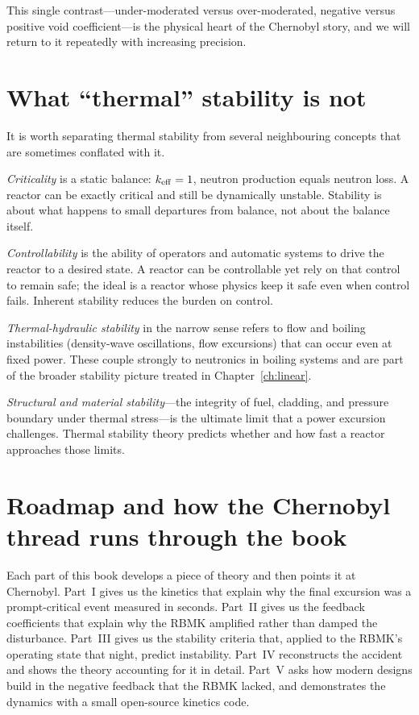 This single contrast---under-moderated versus over-moderated, negative versus
positive void coefficient---is the physical heart of the Chernobyl story, and we
will return to it repeatedly with increasing precision.

\section{What ``thermal'' stability is not}

It is worth separating thermal stability from several neighbouring concepts that
are sometimes conflated with it.

\emph{Criticality} is a static balance: $k_{\mathrm{eff}}=1$, neutron production equals
neutron loss. A reactor can be exactly critical and still be dynamically
unstable. Stability is about what happens to small departures from balance, not
about the balance itself.

\emph{Controllability} is the ability of operators and automatic systems to
drive the reactor to a desired state. A reactor can be controllable yet rely on
that control to remain safe; the ideal is a reactor whose physics keep it safe
even when control fails. Inherent stability reduces the burden on control.

\emph{Thermal-hydraulic stability} in the narrow sense refers to flow and
boiling instabilities (density-wave oscillations, flow excursions) that can
occur even at fixed power. These couple strongly to neutronics in boiling
systems and are part of the broader stability picture treated in
Chapter~\ref{ch:linear}.

\emph{Structural and material stability}---the integrity of fuel, cladding, and
pressure boundary under thermal stress---is the ultimate limit that a power
excursion challenges. Thermal stability theory predicts whether and how fast a
reactor approaches those limits.

\section{Roadmap and how the Chernobyl thread runs through the book}

Each part of this book develops a piece of theory and then points it at
Chernobyl. Part~I gives us the kinetics that explain why the final excursion was
a prompt-critical event measured in seconds. Part~II gives us the feedback
coefficients that explain why the RBMK amplified rather than damped the
disturbance. Part~III gives us the stability criteria that, applied to the
RBMK's operating state that night, predict instability. Part~IV reconstructs the
accident and shows the theory accounting for it in detail. Part~V asks how modern
designs build in the negative feedback that the RBMK lacked, and demonstrates the
dynamics with a small open-source kinetics code.

